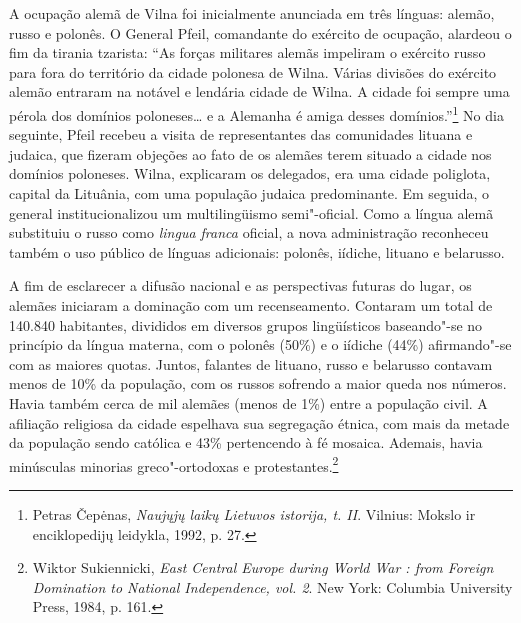 A ocupação alemã de Vilna foi inicialmente anunciada em três línguas:
alemão, russo e polonês. O General Pfeil, comandante do exército de
ocupação, alardeou o fim da tirania tzarista: ``As forças militares
alemãs impeliram o exército russo para fora do território da cidade
polonesa de Wilna. Várias divisões do exército alemão entraram na
notável e lendária cidade de Wilna. A cidade foi sempre uma pérola dos
domínios poloneses\ldots{} e a Alemanha é amiga desses
domínios.''\footnote{Petras Čepėnas, \emph{Naujųjų laikų Lietuvos
  istorija, t. II}. Vilnius: Mokslo ir enciklopedijų leidykla, 1992, p.
  27.} No dia seguinte, Pfeil recebeu a visita de representantes das
comunidades lituana e judaica, que fizeram objeções ao fato de os
alemães terem situado a cidade nos domínios poloneses. Wilna, explicaram
os delegados, era uma cidade poliglota, capital da Lituânia, com uma
população judaica predominante. Em seguida, o general institucionalizou
um multilingüismo semi"-oficial. Como a língua alemã substituiu o russo
como \emph{lingua franca} oficial, a nova administração reconheceu
também o uso público de línguas adicionais: polonês, iídiche, lituano e
belarusso.

A fim de esclarecer a difusão nacional e as perspectivas futuras do
lugar, os alemães iniciaram a dominação com um recenseamento. Contaram
um total de 140.840 habitantes, divididos em diversos grupos
lingüísticos baseando"-se no princípio da língua materna, com o polonês
(50\%) e o iídiche (44\%) afirmando"-se com as maiores quotas. Juntos,
falantes de lituano, russo e belarusso contavam menos de 10\% da
população, com os russos sofrendo a maior queda nos números. Havia
também cerca de mil alemães (menos de 1\%) entre a população civil. A
afiliação religiosa da cidade espelhava sua segregação étnica, com mais
da metade da população sendo católica e 43\% pertencendo à fé mosaica.
Ademais, havia minúsculas minorias greco"-ortodoxas e
protestantes.\footnote{Wiktor Sukiennicki, \emph{East Central Europe
  during World War : from Foreign Domination to National Independence,
  vol. 2}. New York: Columbia University Press, 1984, p. 161.}

